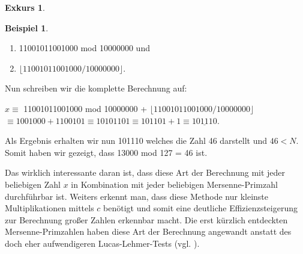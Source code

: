 \documentclass[12pt,a4paper]{article}
\theoremstyle{definition}
\newtheorem{bsp}{Beispiel}[subsection]
\newtheorem{exkurs}{Exkurs}
\begin{document}
\begin{exkurs}
\begin{bsp}
\begin{enumerate}
    \item 11001011001000 mod 10000000 und
    \item $\lfloor11001011001000/10000000\rfloor$.
\end{enumerate}
Nun schreiben wir die komplette Berechnung auf:
\begin{center}
$x \equiv$ 11001011001000 mod 10000000 + $\lfloor11001011001000/10000000\rfloor$ $\equiv 1001000 + 1100101 \equiv 10101101 \equiv 101101 + 1 \equiv \underline{101110}$.
\end{center}
Als Ergebnis erhalten wir nun 101110 welches die Zahl 46 darstellt und $46 < N$.
Somit haben wir gezeigt, dass 13000 mod 127 = 46 ist.
\end{bsp}
Das wirklich interessante daran ist, dass diese Art der Berechnung mit jeder beliebigen Zahl $x$ in Kombination mit jeder beliebigen Mersenne-Primzahl durchführbar ist.
Weiters erkennt man, dass diese Methode nur kleinste Multiplikationen mittels $c$ benötigt und somit eine deutliche Effizienzsteigerung zur Berechnung großer Zahlen erkennbar macht.
Die erst kürzlich entdeckten Mersenne-Primzahlen haben diese Art der Berechnung angewandt anstatt des doch eher aufwendigeren Lucas-Lehmer-Tests (vgl. \cite[454--456]{Crandall2005}). 

\newpage

\end{exkurs}
\end{document}
